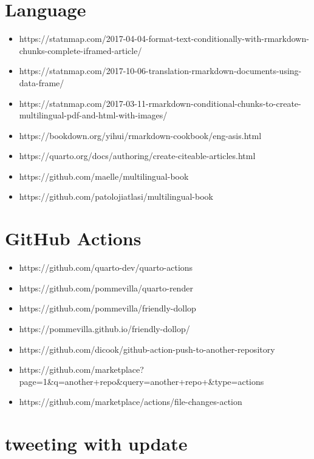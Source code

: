\documentclass[
  letterpaper,
  DIV=11,
  numbers=noendperiod]{scrreprt}
\providecommand{\tightlist}{%
  \setlength{\itemsep}{0pt}\setlength{\parskip}{0pt}}\usepackage{longtable,booktabs,array}
\begin{document}
\hypertarget{language}{%
\section{Language}\label{language}}

\begin{itemize}
\tightlist
\item
  https://statnmap.com/2017-04-04-format-text-conditionally-with-rmarkdown-chunks-complete-iframed-article/
\item
  https://statnmap.com/2017-10-06-translation-rmarkdown-documents-using-data-frame/
\item
  https://statnmap.com/2017-03-11-rmarkdown-conditional-chunks-to-create-multilingual-pdf-and-html-with-images/
\item
  https://bookdown.org/yihui/rmarkdown-cookbook/eng-asis.html
\item
  https://quarto.org/docs/authoring/create-citeable-articles.html
\item
  https://github.com/maelle/multilingual-book
\item
  https://github.com/patolojiatlasi/multilingual-book
\end{itemize}

\hypertarget{github-actions}{%
\section{GitHub Actions}\label{github-actions}}

\begin{itemize}
\tightlist
\item
  https://github.com/quarto-dev/quarto-actions
\item
  https://github.com/pommevilla/quarto-render
\item
  https://github.com/pommevilla/friendly-dollop
\item
  https://pommevilla.github.io/friendly-dollop/
\item
  https://github.com/dicook/github-action-push-to-another-repository
\item
  https://github.com/marketplace?page=1\&q=another+repo\&query=another+repo+\&type=actions
\item
  https://github.com/marketplace/actions/file-changes-action
\end{itemize}

\hypertarget{tweeting-with-update}{%
\section{tweeting with update}\label{tweeting-with-update}}
\end{document}
